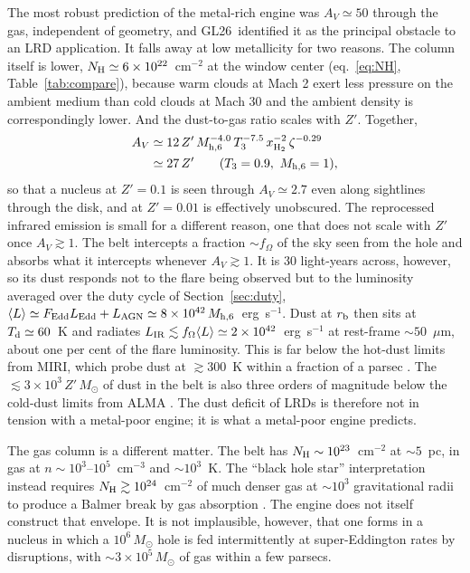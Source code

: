 \documentclass[twocolumn,pdftex]{aastex701}
\newcommand{\msun}{M_{\odot}}
\newcommand{\mhsix}{M_{\rm h,6}}
\newcommand{\Tthree}{T_{3}}
\newcommand{\xhh}{x_{\rm H_2}}
\newcommand{\Zp}{Z'}
\newcommand{\fOm}{f_{\Omega}}
\newcommand{\GL}{GL26}
\begin{document}
The most robust prediction of the metal-rich engine was $A_V\simeq50$ through the gas, independent of geometry, and \GL\ identified it as the principal obstacle to an LRD application. It falls away at low metallicity for two reasons. The column itself is lower, $N_{\rm H}\simeq6\times10^{22}$~cm$^{-2}$ at the window center (eq.~\ref{eq:NH}, Table~\ref{tab:compare}), because warm clouds at Mach 2 exert less pressure on the ambient medium than cold clouds at Mach 30 and the ambient density is correspondingly lower. And the dust-to-gas ratio scales with $\Zp$. Together,
\begin{align}
A_V &\simeq 12\,\Zp\,\mhsix^{-4.0}\,\Tthree^{-7.5}\,\xhh^{-2}\,\zeta^{-0.29} \nonumber\\
&\simeq 27\,\Zp\qquad(\Tthree=0.9,\ \mhsix=1),
\label{eq:AV}
\end{align}
so that a nucleus at $\Zp = 0.1$ is seen through $A_V\simeq2.7$ even along sightlines through the disk, and at $\Zp=0.01$ is effectively unobscured. The reprocessed infrared emission is small for a different reason, one that does not scale with $\Zp$ once $A_V\gtrsim1$. The belt intercepts a fraction $\sim\fOm$ of the sky seen from the hole and absorbs what it intercepts whenever $A_V\gtrsim1$. It is 30 light-years across, however, so its dust responds not to the flare being observed but to the luminosity averaged over the duty cycle of Section~\ref{sec:duty}, $\langle L\rangle\simeq F_{\rm Edd}L_{\rm Edd}+L_{\rm AGN}\simeq8\times10^{42}\,\mhsix$~erg~s$^{-1}$. Dust at $r_{\rm b}$ then sits at $T_{\rm d}\simeq60$~K and radiates $L_{\rm IR}\lesssim\fOm\langle L\rangle\simeq2\times10^{42}$~erg~s$^{-1}$ at rest-frame $\sim50$~$\mu$m, about one per cent of the flare luminosity. This is far below the hot-dust limits from MIRI, which probe dust at $\gtrsim300$~K within a fraction of a parsec \citep{Setton:2025a,Chen:2025a}. The $\lesssim3\times10^{3}\,\Zp\,\msun$ of dust in the belt is also three orders of magnitude below the cold-dust limits from ALMA \citep{Casey:2025a}. The dust deficit of LRDs is therefore not in tension with a metal-poor engine; it is what a metal-poor engine predicts.

The gas column is a different matter. The belt has $N_{\rm H}\sim10^{23}$~cm$^{-2}$ at $\sim5$~pc, in gas at $n\sim10^{3}$--$10^{5}$~cm$^{-3}$ and $\sim10^{3}$~K. The ``black hole star'' interpretation instead requires $N_{\rm H}\gtrsim10^{24}$~cm$^{-2}$ of much denser gas at $\sim10^{3}$ gravitational radii to produce a Balmer break by gas absorption \citep{Naidu:2025a}. The engine does not itself construct that envelope. It is not implausible, however, that one forms in a nucleus in which a $10^{6}\,\msun$ hole is fed intermittently at super-Eddington rates by disruptions, with $\sim3\times10^{5}\,\msun$ of gas within a few parsecs.
\end{document}
